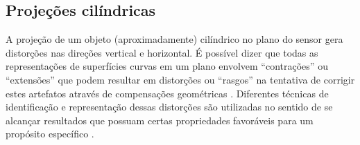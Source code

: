 \subsection{Projeções cilíndricas}

A projeção de um objeto (aproximadamente) cilíndrico no plano do sensor gera distorções nas direções vertical e horizontal. É possível dizer que todas as representações de superfícies curvas em um plano envolvem “contrações” ou “extensões” que podem resultar em distorções ou “rasgos” na tentativa de corrigir estes artefatos através de compensações  geométricas \cite{Shen:2013}. Diferentes técnicas de identificação e representação dessas distorções são utilizadas no sentido de se alcançar resultados que possuam certas propriedades favoráveis para um propósito específico \cite{Shen:2013, Zhao:2013}. 

